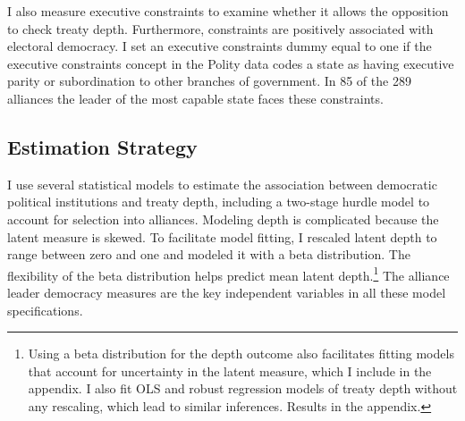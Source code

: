 \documentclass[12pt]{article}
\begin{document}
I also measure executive constraints to examine whether it allows the opposition to check treaty depth. 
Furthermore, constraints are positively associated with electoral democracy.
I set an executive constraints dummy equal to one if the executive constraints concept in the Polity data codes a state as having executive parity or subordination to other branches of government.
In 85 of the 289 alliances the leader of the most capable state faces these constraints.



\subsection{Estimation Strategy}



I use several statistical models to estimate the association between democratic political institutions and treaty depth, including a two-stage hurdle model to account for selection into alliances. 
Modeling depth is complicated because the latent measure is skewed.
To facilitate model fitting, I rescaled latent depth to range between zero and one and modeled it with a beta distribution.
The flexibility of the beta distribution helps predict mean latent depth.\footnote{Using a beta distribution for the depth outcome also facilitates fitting models that account for uncertainty in the latent measure, which I include in the appendix. I also fit OLS and robust regression models of treaty depth without any rescaling, which lead to similar inferences. Results in the appendix.} 
The alliance leader democracy measures are the key independent variables in all these model specifications. 
\end{document}
